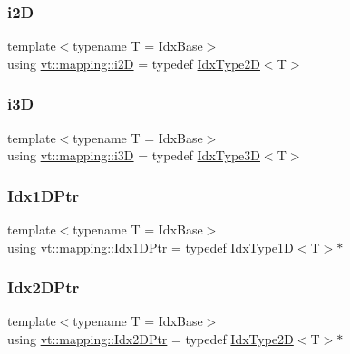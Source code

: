\subsubsection{\texorpdfstring{i2D}{i2D}}
{\footnotesize\ttfamily template$<$typename T  = Idx\+Base$>$ \\
using \hyperlink{namespacevt_1_1mapping_a6448c875e0807b43f31e96fc5b0cec04}{vt\+::mapping\+::i2D} = typedef \hyperlink{namespacevt_ab0fbc5ddf69b5aa0ed6a8d1658b504eb}{Idx\+Type2D}$<$T$>$}

\mbox{\label{namespacevt_1_1mapping_af435b967b9ed1ccb5ec4effdbd9abd13}} 
\subsubsection{\texorpdfstring{i3D}{i3D}}
{\footnotesize\ttfamily template$<$typename T  = Idx\+Base$>$ \\
using \hyperlink{namespacevt_1_1mapping_af435b967b9ed1ccb5ec4effdbd9abd13}{vt\+::mapping\+::i3D} = typedef \hyperlink{namespacevt_a65e4a83c0567ecb7a54b78e9b8e7d7ab}{Idx\+Type3D}$<$T$>$}

\mbox{\label{namespacevt_1_1mapping_a8b576cf2f31069778e4951f64bccafd8}} 
\subsubsection{\texorpdfstring{Idx1\+D\+Ptr}{Idx1DPtr}}
{\footnotesize\ttfamily template$<$typename T  = Idx\+Base$>$ \\
using \hyperlink{namespacevt_1_1mapping_a8b576cf2f31069778e4951f64bccafd8}{vt\+::mapping\+::\+Idx1\+D\+Ptr} = typedef \hyperlink{namespacevt_a36127c6500f2311908c959be653da40e}{Idx\+Type1D}$<$T$>$$\ast$}

\mbox{\label{namespacevt_1_1mapping_a6832cbb1361fe72fd7ec730e7b7773b3}} 
\subsubsection{\texorpdfstring{Idx2\+D\+Ptr}{Idx2DPtr}}
{\footnotesize\ttfamily template$<$typename T  = Idx\+Base$>$ \\
using \hyperlink{namespacevt_1_1mapping_a6832cbb1361fe72fd7ec730e7b7773b3}{vt\+::mapping\+::\+Idx2\+D\+Ptr} = typedef \hyperlink{namespacevt_ab0fbc5ddf69b5aa0ed6a8d1658b504eb}{Idx\+Type2D}$<$T$>$$\ast$}

